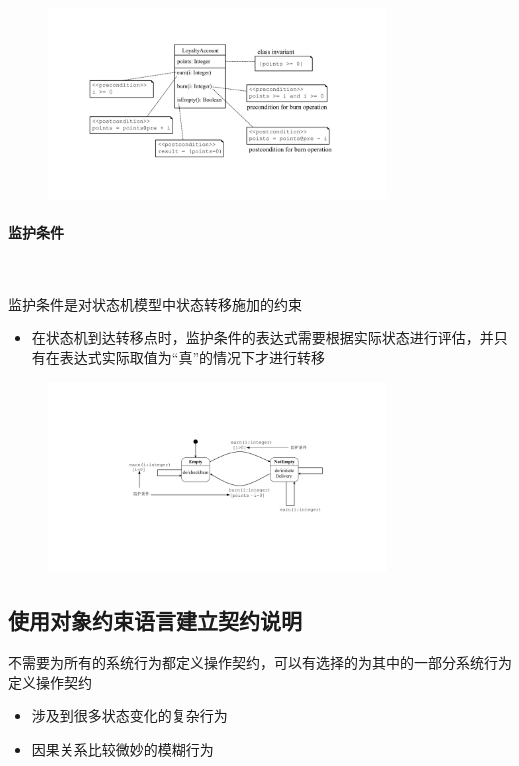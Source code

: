 \begin{figure}[H]
    \centering
    \vspace{-0.2em}
	\includegraphics[width=0.8\textwidth]{img/对象约束语言的应用前置条件和后置条件.pdf}
    \vspace{-1em}
\end{figure}

\paragraph*{监护条件}~{} \par
监护条件是对状态机模型中状态转移施加的约束
\begin{itemize}
    \item 在状态机到达转移点时，监护条件的表达式需要根据实际状态进行评估，并只有在表达式实际取值为“真”的情况下才进行转移
\end{itemize}

\begin{figure}[H]
    \centering
    \vspace{-0.2em}
	\includegraphics[width=0.8\textwidth]{img/对象约束语言的应用监护条件.pdf}
    \vspace{-1em}
\end{figure}


\subsection{使用对象约束语言建立契约说明}
不需要为所有的系统行为都定义操作契约，可以有选择的为其中的一部分系统行为定义操作契约
\vspace{-0.8em}
\begin{multicols}{2}
    \begin{itemize}
        \item 涉及到很多状态变化的复杂行为
        \item 因果关系比较微妙的模糊行为
    \end{itemize}
\end{multicols}
\vspace{-1em}

